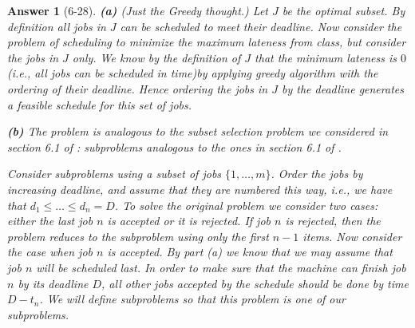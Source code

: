 \documentclass[11pt]{article}
\theoremstyle{numberplain}
\theoremstyle{nonumberplain}
\newtheorem{ans}{Answer}
\newcommand{\0}{{\mathbf{0}}}
\begin{document}
\begin{ans}[6-28]
{\bf (a)} (Just the Greedy thought.)
Let $J$ be the optimal subset. By definition all jobs in $J$ can
be scheduled to meet their deadline. Now consider the problem
of scheduling to minimize the maximum lateness from class, but
consider the jobs in $J$ only. We know by the definition
of $J$ that the minimum lateness is $0$
(i.e., all jobs can be scheduled in time)by applying greedy algorithm with the ordering of their
deadline. Hence ordering 
the jobs in $J$ by the deadline generates a feasible schedule for this
set of jobs.

{\bf (b)} The problem is analogous to the subset selection problem we 
considered in section 6.1 of \cite{jon2005algorithm}: subproblems analogous to the 
ones in section 6.1 of \cite{jon2005algorithm}.  	\par 
Consider 
subproblems using a subset of jobs $\{1,\ldots,m\}$. Order the jobs by increasing deadline, and assume that 
they are numbered this way, i.e., we have that $d_1\le
\ldots \le d_n=D$. To solve the original problem we consider two cases:
either the last job $n$ is accepted or it is rejected. If job $n$ is 
rejected, then the problem reduces to the subproblem using only the 
first $n-1$ items.
Now consider the case when job $n$ is accepted. By part (a) we know 
that we may assume that job $n$ will be scheduled last. In order to 
make sure that the machine can finish job $n$ by its deadline $D$, 
all other jobs accepted by the schedule should be done by time 
$D-t_n$. We will define subproblems so that this problem is one of 
our subproblems.


\end{ans}
\end{document}
